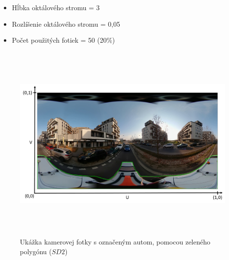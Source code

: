 \begin{itemize}
  \setlength\itemsep{0.2em}
  \item Hĺbka oktálového stromu = 3
  \item Rozlíšenie oktálového stromu = 0,05
  \item Počet použitých fotiek = 50 (20\%)
\end{itemize}

\begin{figure}[!htbp]
  \centering
  \includegraphics[width=16cm, height=10cm]{img/texture_camera_image.png}
  \caption{Ukážka kamerovej fotky s označeným autom, pomocou zeleného polygónu ($SD2$)} 
  \label{fig:texture_camera_image}
\end{figure} 

